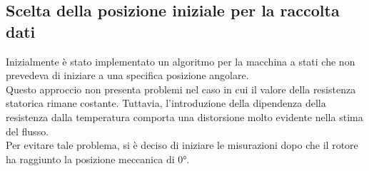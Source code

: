 \subsection{Scelta della posizione iniziale per la raccolta dati}
Inizialmente è stato implementato un algoritmo per la macchina a stati che non prevedeva di iniziare a una specifica posizione angolare.\\
Questo approccio non presenta problemi nel caso in cui il valore della  resistenza statorica rimane costante. Tuttavia, l'introduzione della dipendenza della resistenza dalla temperatura comporta una distorsione molto evidente nella stima del flusso.\\
Per evitare tale problema, si è deciso di iniziare le misurazioni dopo che il rotore ha raggiunto la posizione meccanica di 0°. \\

